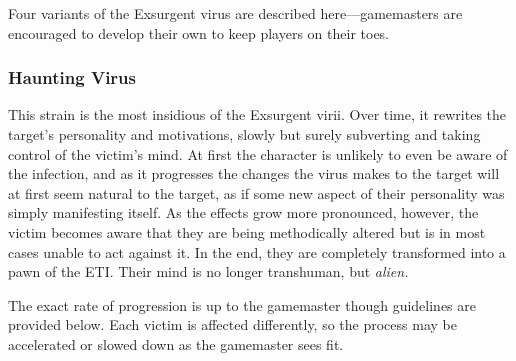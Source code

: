 Four variants of the Exsurgent virus are described 
here—gamemasters are encouraged to develop their 
own to keep players on their toes.

\subsubsection{Haunting Virus}

This strain is the most insidious of the Exsurgent virii. 
Over time, it rewrites the target's personality and 
motivations, slowly but surely subverting and taking 
control of the victim's mind. At first the character is 
unlikely to even be aware of the infection, and as it 
progresses the changes the virus makes to the target 
will at first seem natural to the target, as if some new 
aspect of their personality was simply manifesting 
itself. As the effects grow more pronounced, however, 
the victim becomes aware that they are being methodically
altered but is in most cases unable to act against
it. In the end, they are completely transformed into a 
pawn of the ETI. Their mind is no longer transhuman, 
but \textit{alien.}

The exact rate of progression is up to the gamemaster
though guidelines are provided below. Each victim
is affected differently, so the process may be accelerated 
or slowed down as the gamemaster sees fit.

